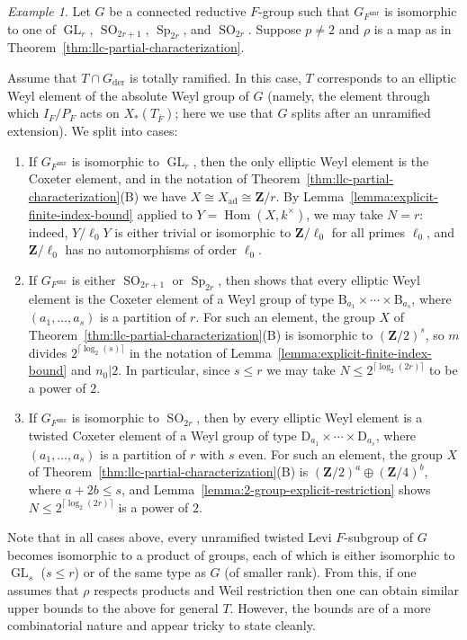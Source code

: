 \documentclass[reqno]{amsart}
\numberwithin{equation}{subsection}
\newcommand{\Z}{\mathbf{Z}}
\newcommand{\ol}[1]{\overline{#1}}
\DeclareMathOperator{\GL}{GL}
\DeclareMathOperator{\Sp}{Sp}
\DeclareMathOperator{\SO}{SO}
\DeclareMathOperator{\Hom}{Hom}
\DeclareMathOperator{\ad}{ad}
\DeclareMathOperator{\unr}{unr}
\DeclareMathOperator{\der}{der}
\theoremstyle{remark}
\newtheorem{example}[thm]{Example}
\numberwithin{equation}{subsection}
\numberwithin{figure}{subsection}
\begin{document}
\begin{example}\label{ex:llc-classical}
Let $G$ be a connected reductive $F$-group such that $G_{F^{\unr}}$ is isomorphic to one of $\GL_r$, $\SO_{2r+1}$, $\Sp_{2r}$, and $\SO_{2r}$. Suppose $p \neq 2$ and $\rho$ is a map as in Theorem~\ref{thm:llc-partial-characterization}.

Assume that $T \cap G_{\der}$ is totally ramified. In this case, $T$ corresponds to an elliptic Weyl element of the absolute Weyl group of $G$ (namely, the element through which $I_F/P_F$ acts on $X_*(T_{\ol F})$; here we use that $G$ splits after an unramified extension). We split into cases:
\begin{enumerate}
    \item If $G_{F^{\unr}}$ is isomorphic to $\GL_r$, then the only elliptic Weyl element is the Coxeter element, and in the notation of Theorem~\ref{thm:llc-partial-characterization}(B) we have $X \cong X_{\ad} \cong \Z/r$. By Lemma~\ref{lemma:explicit-finite-index-bound} applied to $Y = \Hom(X, k^\times)$, we may take $N = r$: indeed, $Y/\ell_0Y$ is either trivial or isomorphic to $\Z/\ell_0$ for all primes $\ell_0$, and $\Z/\ell_0$ has no automorphisms of order $\ell_0$.
    \item If $G_{F^{\unr}}$ is either $\SO_{2r+1}$ or $\Sp_{2r}$, then \cite[\S3.4]{GP00} shows that every elliptic Weyl element is the Coxeter element of a Weyl group of type $\mathrm{B}_{a_1} \times \cdots \times \mathrm{B}_{a_s}$, where $(a_1, \dots, a_s)$ is a partition of $r$. For such an element, the group $X$ of Theorem~\ref{thm:llc-partial-characterization}(B) is isomorphic to $(\Z/2)^s$, so $m$ divides $2^{\lceil \log_2(s)\rceil}$ in the notation of Lemma~\ref{lemma:explicit-finite-index-bound} and $n_0 | 2$. In particular, since $s \leq r$ we may take $N \leq 2^{\lceil\log_2(2r)\rceil}$ to be a power of $2$.
    \item If $G_{F^{\unr}}$ is isomorphic to $\SO_{2r}$, then by \cite[\S3.4]{GP00} every elliptic Weyl element is a twisted Coxeter element of a Weyl group of type $\mathrm{D}_{a_1} \times \cdots \times \mathrm{D}_{a_s}$, where $(a_1, \dots, a_s)$ is a partition of $r$ with $s$ even. For such an element, the group $X$ of Theorem~\ref{thm:llc-partial-characterization}(B) is $(\Z/2)^a \oplus (\Z/4)^b$, where $a+2b \leq s$, and Lemma~\ref{lemma:2-group-explicit-restriction} shows $N \leq 2^{\lceil\log_2(2r)\rceil}$ is a power of $2$.
\end{enumerate}
Note that in all cases above, every unramified twisted Levi $F$-subgroup of $G$ becomes isomorphic to a product of groups, each of which is either isomorphic to $\GL_s$ ($s \leq r$) or of the same type as $G$ (of smaller rank). From this, if one assumes that $\rho$ respects products and Weil restriction then one can obtain similar upper bounds to the above for general $T$. However, the bounds are of a more combinatorial nature and appear tricky to state cleanly.
\end{example}
\end{document}
